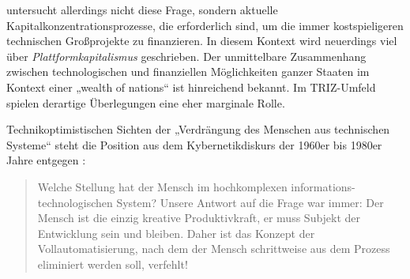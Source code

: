 \documentclass[11pt,a4paper]{article}
\begin{document}
\cite{Goldberg2016} untersucht allerdings nicht diese Frage, sondern aktuelle
Kapitalkonzentrationsprozesse, die erforderlich sind, um die immer
kostspieligeren technischen Großprojekte zu finanzieren.  In diesem Kontext
wird neuerdings viel über \emph{Plattformkapitalismus} geschrieben.  Der
unmittelbare Zusammenhang zwischen technologischen und finanziellen
Möglichkeiten ganzer Staaten im Kontext einer „wealth of nations“ ist
hinreichend bekannt. Im TRIZ-Umfeld spielen derartige Überlegungen eine eher
marginale Rolle.

Technikoptimistischen Sichten der „Verdrängung des Menschen aus technischen
Systeme“ steht die Position aus dem Kybernetikdiskurs der 1960er bis 1980er
Jahre entgegen \cite[S. 10]{KFK2000}:
\begin{quote}
  Welche Stellung hat der Mensch im hochkomplexen informations-technologischen
  System? Unsere Antwort auf die Frage war immer: Der Mensch ist die einzig
  kreative Produktivkraft, er muss Subjekt der Entwicklung sein und bleiben.
  Daher ist das Konzept der Vollautomatisierung, nach dem der Mensch
  schrittweise aus dem Prozess eliminiert werden soll, verfehlt!
\end{quote}
\end{document}
